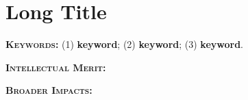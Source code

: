 
\def\thetitle{Long Title}
\def\shorttitle{Title}
\def\theauthors{PI: \uline{Geoffrey Challen}\\\textit{SUNY Buffalo}}
\def\shortauthors{Challen}
\def\submissiondate{\today}

\chapter{\thetitle}


\textbf{\textsc{Keywords:}} (1) \textbf{keyword}; (2) \textbf{keyword}; (3)
\textbf{keyword}.

\textbf{\textsc{Intellectual Merit:}}

\textbf{\textsc{Broader Impacts:}}

